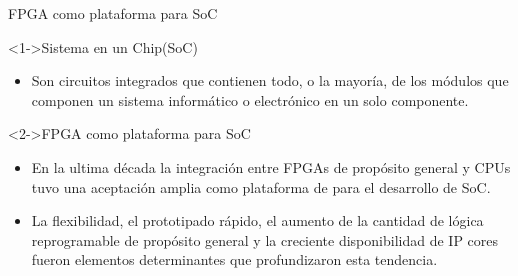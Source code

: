 \documentclass[xcolor=dvipsnames]{beamer}
\begin{document}
\begin{frame}{FPGA como plataforma para SoC}
  \begin{block}<1->{Sistema en un Chip(SoC)} 
    \begin{itemize}
      \scriptsize
      \item Son circuitos integrados que contienen todo, o la mayoría, de los módulos que componen un sistema informático o electrónico en un solo componente.
    \end{itemize}      
  \end{block}

  \begin{block}<2->{FPGA como plataforma para SoC} 
    \begin{itemize}
      \scriptsize
      \item En la ultima década la integración entre FPGAs de propósito general y CPUs tuvo una aceptación amplia como plataforma de para el desarrollo de SoC.    
	\item La flexibilidad, el prototipado rápido, el aumento de la cantidad de lógica reprogramable de propósito general y la creciente disponibilidad de IP cores fueron elementos determinantes que profundizaron esta tendencia.
	

    \end{itemize}      
  \end{block}
\end{frame}
\end{document}
